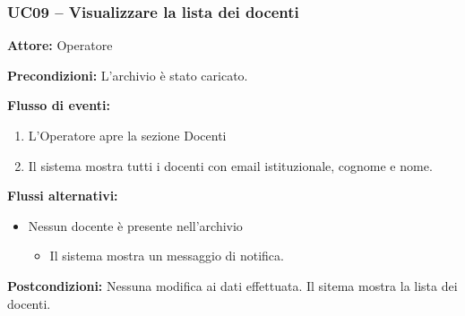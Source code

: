 \documentclass[a4paper,11pt]{article}
\begin{document}
\begin{samepage}
\subsubsection*{UC09 -- Visualizzare la lista dei docenti}
\begin{ucbox}

\noindent\textbf{Attore:} Operatore\par
\noindent\textbf{Precondizioni:} L'archivio è stato caricato.\par

\noindent\textbf{Flusso di eventi:}
\begin{enumerate}
\item L'Operatore apre la sezione Docenti \item Il sistema mostra tutti i docenti con email istituzionale, cognome e nome. \end{enumerate}
\noindent\textbf{Flussi alternativi:}
\begin{itemize}
\item[2a.] Nessun docente è presente nell'archivio
\begin{itemize}
\item Il sistema mostra un messaggio di notifica.
\end{itemize}
\end{itemize}
\noindent\textbf{Postcondizioni:} Nessuna modifica ai dati effettuata. Il sitema mostra la lista dei docenti.\par
\end{ucbox}
\end{samepage}
\end{document}
